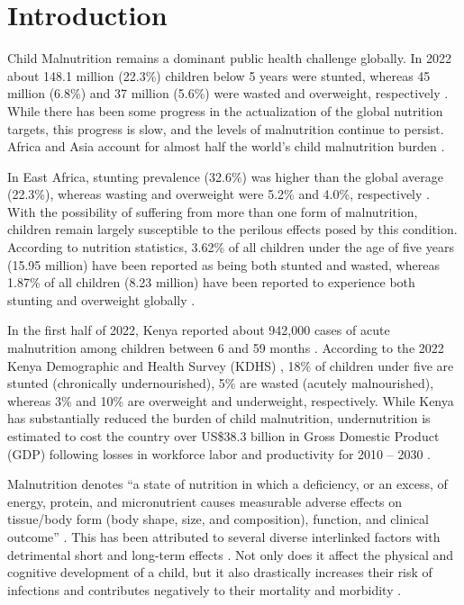 \documentclass[sn-basic,Numbered,pdflatex]{sn-jnl}
\theoremstyle{remark}
\theoremstyle{definition}
\begin{document}
\maketitle

\hypertarget{sec1}{%
\section{Introduction}\label{sec1}}

Child Malnutrition remains a dominant public health challenge globally.
In 2022 about 148.1 million (22.3\%) children below 5 years were
stunted, whereas 45 million (6.8\%) and 37 million (5.6\%) were wasted
and overweight, respectively \citep{who2023}. While there has been some
progress in the actualization of the global nutrition targets, this
progress is slow, and the levels of malnutrition continue to persist.
Africa and Asia account for almost half the world's child malnutrition
burden \citep{who2023}.

In East Africa, stunting prevalence (32.6\%) was higher than the global
average (22.3\%), whereas wasting and overweight were 5.2\% and 4.0\%,
respectively \citep{IEG2022}. With the possibility of suffering from
more than one form of malnutrition, children remain largely susceptible
to the perilous effects posed by this condition. According to nutrition
statistics, 3.62\% of all children under the age of five years (15.95
million) have been reported as being both stunted and wasted, whereas
1.87\% of all children (8.23 million) have been reported to experience
both stunting and overweight globally \citep{global}.

In the first half of 2022, Kenya reported about 942,000 cases of acute
malnutrition among children between 6 and 59 months
\citep{Bhavnani2023}. According to the 2022 Kenya Demographic and Health
Survey (KDHS) \citep{KNBSICF2023}, 18\% of children under five are
stunted (chronically undernourished), 5\% are wasted (acutely
malnourished), whereas 3\% and 10\% are overweight and underweight,
respectively. While Kenya has substantially reduced the burden of child
malnutrition, undernutrition is estimated to cost the country over
US\$38.3 billion in Gross Domestic Product (GDP) following losses in
workforce labor and productivity for 2010 -- 2030 \citep{USAID2018}.

Malnutrition denotes ``a state of nutrition in which a deficiency, or an
excess, of energy, protein, and micronutrient causes measurable adverse
effects on tissue/body form (body shape, size, and composition),
function, and clinical outcome'' \citep{stratton2003}. This has been
attributed to several diverse interlinked factors with detrimental short
and long-term effects \citep{Pelletier1995, Pelletier2003}. Not only
does it affect the physical and cognitive development of a child, but it
also drastically increases their risk of infections and contributes
negatively to their mortality and morbidity
\citep{Rice2000, jonah2018, victora2008, kar2008, mendez1999, walker2015, rabbani2016}.
\end{document}
